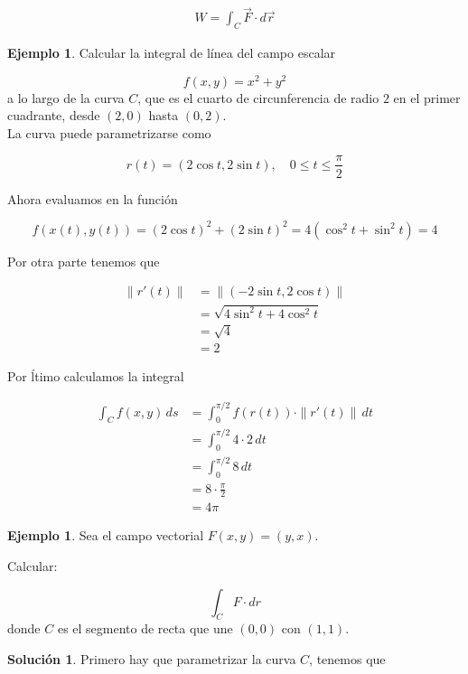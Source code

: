 \documentclass{article}
\theoremstyle{plain}
\theoremstyle{definition}
\newtheorem{ejem}[thm]{Ejemplo}
\newtheorem{sol}[thm]{Solución}
\begin{document}
\begin{align*}
    W = \int_C \vec{F} \cdot  d\vec{r}
\end{align*}

\newpage

\begin{ejem}Calcular la integral de línea del campo escalar
\end{ejem}
\[
f(x, y) = x^2 + y^2
\]
a lo largo de la curva $C$, que es el cuarto de circunferencia de radio $2$ en el primer cuadrante, desde $(2,0)$ hasta $(0,2)$. \\


La curva puede parametrizarse como

\[
r(t) = (2\cos t, 2\sin t), \quad 0 \leq t \leq \frac{\pi}{2}
\]

Ahora evaluamos en la funci\'on

\[
f(x(t), y(t)) = (2\cos t)^2 + (2\sin t)^2 = 4(\cos^2 t + \sin^2 t) = 4
\]

Por otra parte tenemos que

\begin{align*}
    \|r'(t)\| &= \|(-2\sin t, 2\cos t)\| \\
    &= \sqrt{4\sin^2 t + 4\cos^2 t} \\
    &= \sqrt{4} \\
    &= 2
\end{align*}

Por \'ltimo calculamos la integral



\begin{align*}
    \int_C f(x, y) \, ds &= \int_0^{\pi/2} f(r(t)) \cdot \|r'(t)\| \, dt \\
    &=  \int_0^{\pi/2} 4 \cdot 2 \, dt \\
    &= \int_0^{\pi/2} 8 \, dt \\
    &= 8 \cdot \frac{\pi}{2} \\
    &= 4\pi
\end{align*}






\begin{ejem}Sea el campo vectorial $F(x, y) = (y, x)$.
\end{ejem}
Calcular:

\[
\int_C F \cdot dr
\]
donde $C$ es el segmento de recta que une $(0, 0)$ con $(1, 1)$. \\


\begin{sol}Primero hay que parametrizar la curva $C$, tenemos que
\end{sol}
\end{document}
